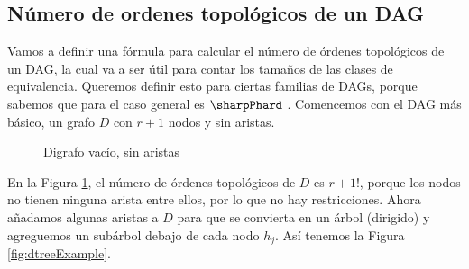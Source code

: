 \subsection{Número de ordenes topológicos de un DAG}\label{sect:Number Of Toposorts}

Vamos a definir una fórmula para calcular el número de órdenes topológicos de un DAG, la cual va a ser útil para contar los tamaños de las clases de equivalencia. Queremos definir esto para ciertas familias de DAGs, porque sabemos que para el caso general es $\sharpPhard$ \cite{countingLinearExtensions}. Comencemos con el DAG más básico, un grafo $D$ con $r+1$ nodos y sin aristas.


\begin{figure}[ht]
\centering 
    \caption{Digrafo vacío, sin aristas}
    \label{fig:emptyGraphExample}
\end{figure}

En la Figura \ref{fig:emptyGraphExample}, el número de órdenes topológicos de $D$ es $r+1!$, porque los nodos no tienen ninguna arista entre ellos, por lo que no hay restricciones. Ahora añadamos algunas aristas a $D$ para que se convierta en un árbol (dirigido) y agreguemos un subárbol debajo de cada nodo $h_j$. Así tenemos la Figura \ref{fig:dtreeExample}.


